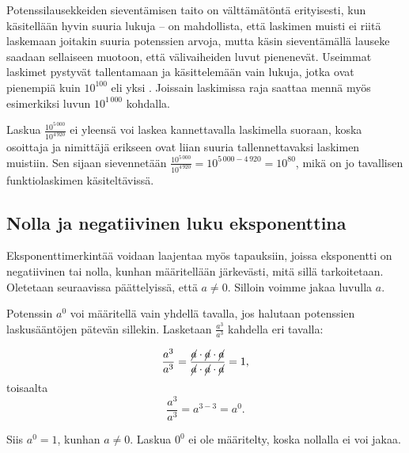  
Potenssilausekkeiden sieventämisen taito on välttämätöntä erityisesti, kun käsitellään hyvin suuria lukuja -- on mahdollista, että laskimen muisti ei riitä laskemaan joitakin suuria potenssien arvoja, mutta käsin sieventämällä lauseke saadaan sellaiseen muotoon, että välivaiheiden luvut pienenevät. Useimmat laskimet pystyvät tallentamaan ja käsittelemään vain lukuja, jotka ovat pienempiä kuin $10^{100}$ eli yksi . Joissain laskimissa raja saattaa mennä myös esimerkiksi luvun $10^{1\,000}$ kohdalla.

\begin{esimerkki}
 Laskua $\frac{10^{5\,000}}{10^{4\,920}}$ ei yleensä voi laskea kannettavalla laskimella suoraan, koska osoittaja ja nimittäjä erikseen ovat liian suuria tallennettavaksi laskimen muistiin. Sen sijaan sievennetään $\frac{10^{5\,000}}{10^{4\,920}}=10^{5\,000-4\,920}=10^{80}$, mikä on jo tavallisen funktiolaskimen käsiteltävissä.
\end{esimerkki}
 
\subsection{Nolla ja negatiivinen luku eksponenttina}

Eksponenttimerkintää voidaan laajentaa myös tapauksiin, joissa eksponentti on negatiivinen tai nolla, kunhan määritellään järkevästi, mitä sillä tarkoitetaan. Oletetaan seuraavissa päättelyissä, että $a \neq 0$. Silloin voimme jakaa luvulla $a$.

Potenssin $a^0$ voi määritellä vain yhdellä tavalla, jos halutaan potenssien laskusääntöjen pätevän sillekin. Lasketaan $\frac{a^3}{a^3}$ kahdella eri tavalla:

    \[
        \frac{a^3}{a^3}=\frac{\cancel{a}\cdot \cancel{a}\cdot \cancel{a}}
        {\cancel{a}\cdot \cancel{a}\cdot \cancel{a}}=1,
    \]
	toisaalta
 \[ \frac{a^3}{a^3}=a^{3-3}=a^0. \]

Siis $a^0=1$, kunhan $a\neq 0$. Laskua $0^0$ ei ole määritelty, koska nollalla ei voi jakaa. 
 
  
    
    \begin{esimerkki}
    \end{esimerkki}    
    
